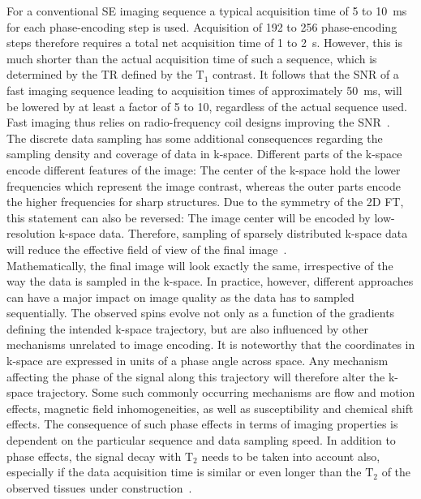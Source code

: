 For a conventional SE imaging sequence
a typical acquisition time of 5 to 10~ms for each phase-encoding step is used. Acquisition of 
192 to 256 phase-encoding steps therefore requires a total net acquisition time of 1 to 2~s. However, this is much shorter than the 
actual
acquisition time of such a sequence, which is determined by the TR defined by the $\text{T}_1$ contrast. It follows that the SNR of a fast imaging sequence leading to acquisition times of approximately 50~ms, will be lowered by at least a factor of 5 to 10, regardless of the actual sequence used. Fast imaging thus relies on radio-frequency coil designs improving the SNR~\cite{SamplingStrategies}.\\
The discrete data sampling has some additional consequences regarding the sampling density and coverage of data in k-space. Different parts of the k-space encode different features of the image: The center of the k-space hold the lower frequencies which represent the image contrast, whereas the outer parts encode the higher frequencies for sharp structures. Due to the symmetry of the 2D FT, this statement can also be reversed: The image center will be encoded by low-resolution k-space data. Therefore, sampling of sparsely distributed k-space data will reduce the effective field of view of the final image~\cite{AdvancesPI,SamplingStrategies}. \\
Mathematically, the final image will look exactly the same, irrespective of the way the data is sampled in the k-space. In practice, however, different approaches 
can have a major impact on image quality
as the data has to 
sampled
sequentially. The observed spins evolve not only as a function of the gradients defining the intended k-space trajectory, but are also influenced by other mechanisms unrelated to image encoding. It is noteworthy that the coordinates in k-space are expressed in units of a phase angle across space. Any mechanism affecting the phase of the signal along this trajectory will therefore alter the k-space trajectory. Some such commonly occurring mechanisms are flow and motion effects, magnetic field inhomogeneities, as well as susceptibility and chemical shift effects. The consequence of such phase effects in terms of imaging properties is dependent on the particular sequence and data sampling speed. In addition to phase effects, the signal decay with $\text{T}_2$ needs to be taken into account also, especially if the data acquisition time is similar or even longer than the $\text{T}_2$ of the observed tissues under construction~\cite{SamplingStrategies}.

